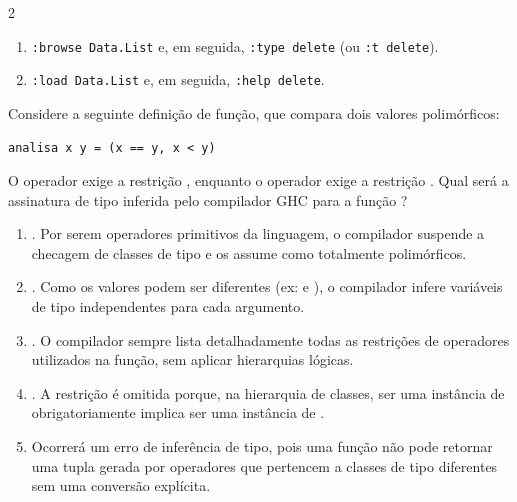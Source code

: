 \documentclass[a4paper,10pt,brazil]{article}
\begin{document}
\begin{multicols}{2}
\begin{enumerate}
  \item \texttt{:browse Data.List} e, em seguida, \texttt{:type delete} (ou \texttt{:t delete}).

  \item \texttt{:load Data.List} e, em seguida, \texttt{:help delete}.


\end{enumerate}

Considere a seguinte definição de função, que compara dois valores polimórficos:
\begin{verbatim}
analisa x y = (x == y, x < y)
\end{verbatim}
O operador \haskellinline{==} exige a restrição , enquanto o operador \haskellinline{<} exige a restrição . Qual será a assinatura de tipo inferida pelo compilador GHC para a função ?

\begin{enumerate}
  \item {}. Por serem operadores primitivos da linguagem, o compilador suspende a checagem de classes de tipo e os assume como totalmente polimórficos.

  \item {}. Como os valores podem ser diferentes (ex:  e ), o compilador infere variáveis de tipo independentes para cada argumento.

  \item {}. O compilador sempre lista detalhadamente todas as restrições de operadores utilizados na função, sem aplicar hierarquias lógicas.

  \item {}. A restrição  é omitida porque, na hierarquia de classes, ser uma instância de  obrigatoriamente implica ser uma instância de .

  \item Ocorrerá um erro de inferência de tipo, pois uma função não pode retornar uma tupla gerada por operadores que pertencem a classes de tipo diferentes sem uma conversão explícita.


\end{enumerate}


\end{multicols}
\end{document}
